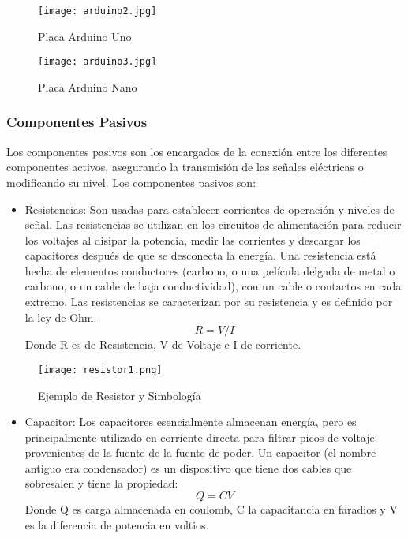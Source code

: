\begin{figure}[H]
	\centering
	\texttt{[image: arduino2.jpg]}
	\caption{Placa Arduino Uno}
\end{figure}

\begin{figure}[H]
	\centering
	\texttt{[image: arduino3.jpg]}
	\caption{Placa Arduino Nano}
\end{figure}

\subsubsection{Componentes Pasivos \cite{artofelectronics}}

\par \noindent
Los componentes pasivos son los encargados de la conexión entre los diferentes componentes activos, asegurando la transmisión de las señales eléctricas o modificando su nivel. Los componentes pasivos son:

\begin{itemize}
	\item Resistencias: Son usadas para establecer corrientes de operación y niveles de señal. Las resistencias se utilizan en los circuitos de alimentación para reducir los voltajes al disipar la potencia, medir las corrientes y descargar los capacitores después de que se desconecta la energía. Una resistencia está hecha de elementos conductores (carbono, o una película delgada de metal o carbono, o un cable de baja conductividad), con un cable o contactos en cada extremo. Las resistencias se caracterizan por su resistencia y es definido por la ley de Ohm. 
	$$R = V/I$$
	Donde R es de Resistencia, V de Voltaje e I de corriente.
\end{itemize}

\begin{figure}[H]
	\centering
	\texttt{[image: resistor1.png]}
	\caption{Ejemplo de Resistor y Simbología}
\end{figure}

\begin{itemize}
	\item Capacitor: Los capacitores esencialmente almacenan energía, pero es principalmente utilizado en corriente directa para filtrar picos de voltaje provenientes de la fuente de la fuente de poder. Un capacitor (el nombre antiguo era condensador) es un dispositivo que tiene dos cables que sobresalen y tiene la propiedad: 
	$$Q = CV$$
	Donde Q es carga almacenada en coulomb, C la capacitancia en faradios y V es la diferencia de potencia en voltios.
\end{itemize}

